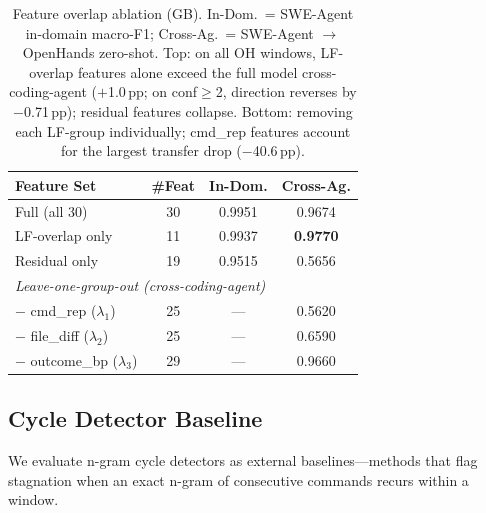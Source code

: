 \begin{table}[h]
\centering
\small
\begin{tabular}{lccc}
\toprule
\textbf{Feature Set} & \textbf{\#Feat} & \textbf{In-Dom.} & \textbf{Cross-Ag.} \\
\midrule
Full (all 30) & 30 & 0.9951 & 0.9674 \\
LF-overlap only & 11 & 0.9937 & \textbf{0.9770} \\
Residual only & 19 & 0.9515 & 0.5656 \\
\midrule
\multicolumn{4}{l}{\emph{Leave-one-group-out (cross-coding-agent)}} \\
$-$ cmd\_rep ($\lambda_1$) & 25 & --- & 0.5620 \\
$-$ file\_diff ($\lambda_2$) & 25 & --- & 0.6590 \\
$-$ outcome\_bp ($\lambda_3$) & 29 & --- & 0.9660 \\
\bottomrule
\end{tabular}
\caption{Feature overlap ablation (GB). In-Dom.\ = SWE-Agent in-domain macro-F1; Cross-Ag.\ = SWE-Agent $\to$ OpenHands zero-shot. Top: on all OH windows, LF-overlap features alone exceed the full model cross-coding-agent ($+$1.0\,pp; on conf${\geq}$2, direction reverses by $-$0.71\,pp); residual features collapse. Bottom: removing each LF-group individually; cmd\_rep features account for the largest transfer drop ($-$40.6\,pp).}
\label{tab:feature_overlap}
\end{table}

\subsection{Cycle Detector Baseline}
\label{sec:app_cycle_detector}

We evaluate n-gram cycle detectors as external baselines---methods that flag stagnation when an exact n-gram of consecutive commands recurs within a window.

